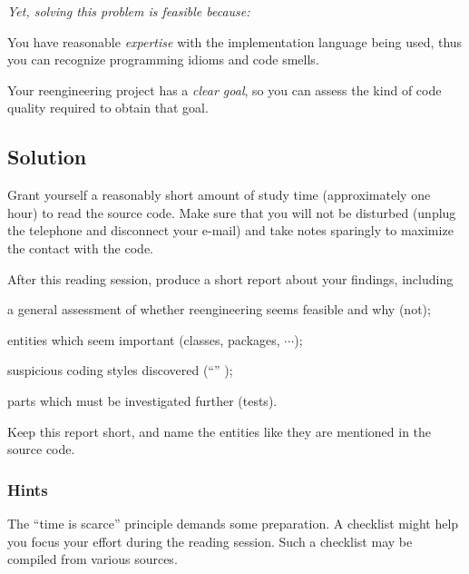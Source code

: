 \documentclass[a4paper,10pt,twoside]{book}
\begin{document}
\emph{Yet, solving this problem is feasible because:}

\begin{bulletlist}
  \item You have reasonable \emph{expertise} with the implementation language being used, thus you can recognize programming idioms and code smells.

  \item Your reengineering project has a \emph{clear goal}, so you can assess the kind of code quality required to obtain that goal.

\end{bulletlist}

\subsection*{Solution}

Grant yourself a reasonably short amount of study time (\ie approximately one hour) to read the source code. Make sure that you will not be disturbed (unplug the telephone and disconnect your e-mail) and take notes sparingly to maximize the contact with the code. 

After this reading session, produce a short report about your findings, including
\begin{bulletlist}
  \item a general assessment of whether reengineering seems feasible and why (not);

  \item entities which seem important (\ie classes, packages, $\cdots$);

  \item suspicious coding styles discovered (\ie ``'' \cite{Fowl99a});

  \item parts which must be investigated further (\ie tests).

\end{bulletlist}

Keep this report short, and name the entities like they are mentioned in the source code.

\subsubsection*{Hints}

The ``time is scarce'' principle demands some preparation. A checklist might help you focus your effort during the reading session. Such a checklist may be compiled from various sources.
\end{document}
